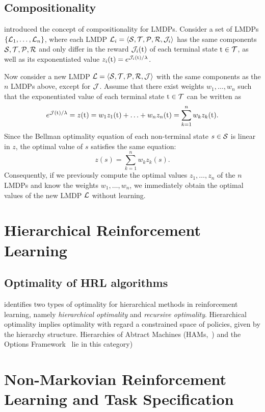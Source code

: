 \subsection{Compositionality}

\citet{Todorov2009a} introduced the concept of compositionality for LMDPs. Consider a set of LMDPs $\{\mathcal{L}_1,\ldots,\mathcal{L}_n\}$, where each LMDP $\mathcal{L}_i=\langle\mathcal{S},\mathcal{T},\mathcal{P},\mathcal{R},\mathcal{J}_i\rangle$ has the same components $\mathcal{S},\mathcal{T},\mathcal{P},\mathcal{R}$ and only differ in the reward $\mathcal{J}_i(\text{t})$ of each terminal state $\text{t}\in\mathcal{T}$, as well as its exponentiated value $z_i(\text{t})=e^{\mathcal{J}_i(\text{t})/\lambda}$.

Now consider a new LMDP $\mathcal{L}=\langle\mathcal{S},\mathcal{T},\mathcal{P},\mathcal{R},\mathcal{J}\rangle$ with the same components as the $n$ LMDPs above, except for $\mathcal{J}$. Assume that there exist weights $w_1,\ldots,w_n$ such that the exponentiated value of each terminal state $\text{t}\in\mathcal{T}$ can be written as
\[
e^{\mathcal{J}(\text{t})/\lambda} = z(\text{t}) = w_1z_1(\text{t}) + \ldots + w_nz_n(\text{t}) = \sum_{k=1}^n w_kz_k(\text{t}).
\]
Since the Bellman optimality equation of each non-terminal state $s\in\mathcal{S}$ is linear in $z$, the optimal value of $s$ satisfies the same equation:
\[
z(s) = \sum_{k=1}^n w_kz_k(s).
\]
Consequently, if we previously compute the optimal values $z_1,\ldots,z_n$ of the $n$ LMDPs and know the weights $w_1,\ldots,w_n$, we immediately obtain the optimal values of the new LMDP $\mathcal{L}$ without learning.




\section{Hierarchical Reinforcement Learning}
\subsection{Optimality of HRL algorithms}
\cite{Dietterich2000} identifies two types of optimality for hierarchical methods in reinforcement learning, namely \textit{hierarchical optimality} and \textit{recursive optimality}. Hierarchical optimality implies optimality with regard a constrained space of policies, given by the hierarchy structure. Hierarchies of Abtract Machines (HAMs,~\cite{Parr1997}) and the Options Framework~\citep{Sutton1999} lie in this category) 


\section{Non-Markovian Reinforcement Learning and Task Specification}

